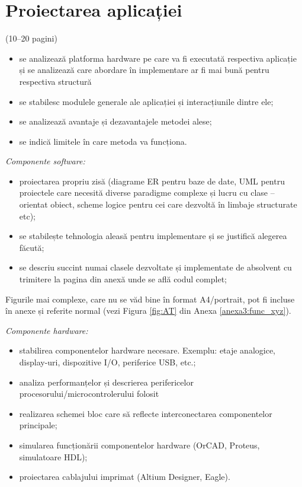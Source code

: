 \chapter{Proiectarea aplicației}
\label{cap:cap2}

(10–20 pagini)

\begin{itemize}
    \item se analizează platforma hardware pe care va fi executată respectiva aplicație și se analizează care abordare în implementare ar fi mai bună pentru respectiva structură
    \item se stabilesc modulele generale ale aplicației și interacțiunile dintre ele;
    \item se analizează avantaje și dezavantajele metodei alese;
    \item se indică limitele în care metoda va funcționa. 
\end{itemize}

\textit{Componente software:}
\begin{itemize}
    \item proiectarea propriu zisă (diagrame ER pentru baze de date, UML pentru proiectele care necesită diverse paradigme complexe și lucru cu clase – orientat obiect, scheme logice pentru cei care dezvoltă în limbaje structurate etc);
    \item se stabilește tehnologia aleasă pentru implementare și se justifică alegerea făcută;
    \item se descriu succint numai clasele dezvoltate și implementate de absolvent cu trimitere la pagina din anexă unde se află codul complet;
\end{itemize}

Figurile mai complexe, care nu se văd bine în format A4/portrait, pot fi incluse în anexe și referite normal (vezi Figura \ref{fig:AT} din Anexa \ref{anexa3:func_xyz}).

\vspace{1em}

\textit{Componente hardware:}
\begin{itemize}
    \item stabilirea componentelor hardware necesare. Exemplu: etaje analogice, display-uri, dispozitive I/O, periferice USB, etc.;
    \item analiza performanțelor și descrierea perifericelor procesorului/microcontrolerului folosit
    \item realizarea schemei bloc care să reflecte interconectarea componentelor principale;
    \item simularea funcționării componentelor hardware (OrCAD, Proteus, simulatoare HDL);
    \item proiectarea cablajului imprimat (Altium Designer, Eagle).
\end{itemize}

